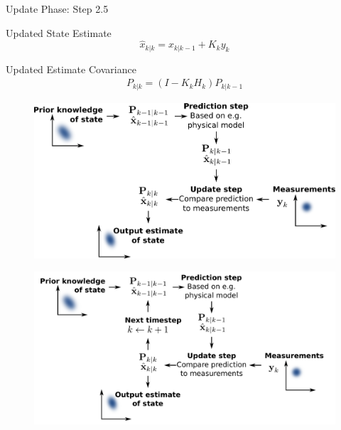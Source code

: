 \documentclass[aspectratio=169,hyperref={pdfpagelabels=false}]{beamer}
\begin{document}
\begin{frame}{Update Phase: Step 2.5}
  \begin{block}{Updated State Estimate}
    \[ \hat{x}_{k|k} = \hat{x}_{k|k-1} + K_{k}y_{k} \]
\end{block}
  \begin{block}{Updated Estimate Covariance}
    \begin{align*}
      P_{k|k} = (I - K_{k}H_{k})P_{k|k-1}
    \end{align*}
\end{block}
\end{frame}

\begin{frame}
  \begin{figure}
    \centering
    \includegraphics[width=1\linewidth]{img/5.pdf}
  \end{figure}
\end{frame}


\begin{frame}
  \begin{figure}
    \centering
    \includegraphics[width=1\linewidth]{img/Basic_concept_of_Kalman_filtering.pdf}
  \end{figure}
\end{frame}
\end{document}
